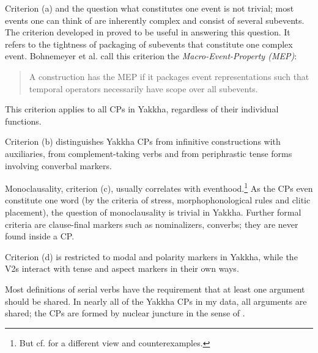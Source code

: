 Criterion (a) and the question what constitutes one event is not trivial; most events one can think of are inherently complex and consist of several subevents. The criterion developed in \citet{Bohnemeyeretal2007_Principles} proved to be  useful in answering this question. It refers to the tightness of packaging of subevents that constitute one complex event. Bohnemeyer et al. call this criterion the \emph{Macro-Event-Property (MEP)}: 
\begin{quote}
A construction has the MEP if it packages event representations such that temporal operators necessarily have scope over all subevents. \citep[504-5]{Bohnemeyeretal2007_Principles}
\end{quote}

This criterion applies to all CPs in Yakkha, regardless of their individual functions. 

Criterion (b) distinguishes Yakkha CPs from infinitive constructions with auxiliaries, from complement-taking verbs and from periphrastic tense forms involving converbal markers. 

Monoclausality, criterion (c), usually correlates with eventhood.\footnote{But cf. \citet{Foley2010_Events} for a different view and counterexamples.} As the CPs even constitute one word (by the criteria of stress, morphophonological rules and clitic placement), the question of monoclausality is trivial in Yakkha. Further formal criteria are clause-final markers such as  nominalizers, converbs; they are never found inside a CP.  

Criterion (d) is restricted to modal and polarity markers in Yakkha, while the V2s interact with tense and aspect markers in their own ways. 

Most definitions of serial verbs have the requirement that at least one argument should be shared. In nearly all of the Yakkha CPs in my data, all arguments are shared; the CPs are formed by nuclear juncture in the sense of \citet[190]{Foleyetal1984Functional}. 

